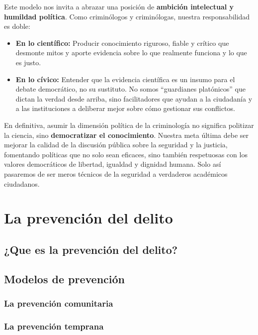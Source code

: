 \documentclass[
  spanish,
  letterpaper,
  DIV=11,
  numbers=noendperiod]{scrreprt}
\begin{document}
Este modelo nos invita a abrazar una posición de \textbf{ambición
intelectual y humildad política}. Como criminólogos y criminólogas,
nuestra responsabilidad es doble:

\begin{itemize}
\item
  \textbf{En lo científico:} Producir conocimiento riguroso, fiable y
  crítico que desmonte mitos y aporte evidencia sobre lo que realmente
  funciona y lo que es justo.
\item
  \textbf{En lo cívico:} Entender que la evidencia científica es un
  insumo para el debate democrático, no su sustituto. No somos
  ``guardianes platónicos'' que dictan la verdad desde arriba, sino
  facilitadores que ayudan a la ciudadanía y a las instituciones a
  deliberar mejor sobre cómo gestionar sus conflictos.
\end{itemize}

En definitiva, asumir la dimensión política de la criminología no
significa politizar la ciencia, sino \textbf{democratizar el
conocimiento}. Nuestra meta última debe ser mejorar la calidad de la
discusión pública sobre la seguridad y la justicia, fomentando políticas
que no solo sean eficaces, sino también respetuosas con los valores
democráticos de libertad, igualdad y dignidad humana. Solo así pasaremos
de ser meros técnicos de la seguridad a verdaderos académicos
ciudadanos.

\chapter{La prevención del delito}\label{la-prevenciuxf3n-del-delito}

\section{¿Que es la prevención del
delito?}\label{que-es-la-prevenciuxf3n-del-delito}

\section{Modelos de prevención}\label{modelos-de-prevenciuxf3n}

\subsection{La prevención
comunitaria}\label{la-prevenciuxf3n-comunitaria}

\subsection{La prevención temprana}\label{la-prevenciuxf3n-temprana}
\end{document}
